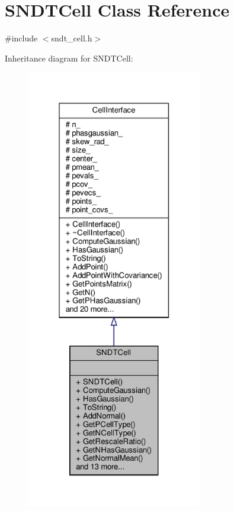 \hypertarget{classSNDTCell}{}\section{S\+N\+D\+T\+Cell Class Reference}
\label{classSNDTCell}


{\ttfamily \#include $<$sndt\+\_\+cell.\+h$>$}



Inheritance diagram for S\+N\+D\+T\+Cell\+:\nopagebreak
\begin{figure}[H]
\begin{center}
\leavevmode
\includegraphics[height=550pt]{d1/da5/classSNDTCell__inherit__graph}
\end{center}
\end{figure}



